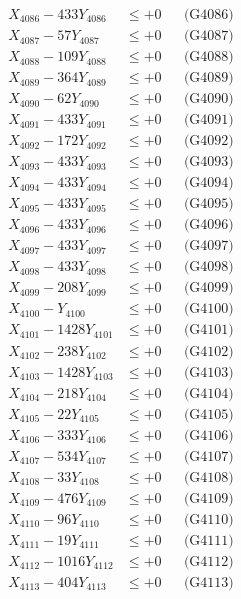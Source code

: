 \documentclass[a4paper,10pt]{article}
\begin{document}
{\begin{align}
X_{4086} - 433Y_{4086} &\leq +0 && \text{(G4086)} \\
X_{4087} - 57Y_{4087} &\leq +0 && \text{(G4087)} \\
X_{4088} - 109Y_{4088} &\leq +0 && \text{(G4088)} \\
X_{4089} - 364Y_{4089} &\leq +0 && \text{(G4089)} \\
X_{4090} - 62Y_{4090} &\leq +0 && \text{(G4090)} \\
\allowbreak
X_{4091} - 433Y_{4091} &\leq +0 && \text{(G4091)} \\
X_{4092} - 172Y_{4092} &\leq +0 && \text{(G4092)} \\
X_{4093} - 433Y_{4093} &\leq +0 && \text{(G4093)} \\
X_{4094} - 433Y_{4094} &\leq +0 && \text{(G4094)} \\
X_{4095} - 433Y_{4095} &\leq +0 && \text{(G4095)} \\
X_{4096} - 433Y_{4096} &\leq +0 && \text{(G4096)} \\
X_{4097} - 433Y_{4097} &\leq +0 && \text{(G4097)} \\
X_{4098} - 433Y_{4098} &\leq +0 && \text{(G4098)} \\
X_{4099} - 208Y_{4099} &\leq +0 && \text{(G4099)} \\
X_{4100} - Y_{4100} &\leq +0 && \text{(G4100)} \\
\allowbreak
X_{4101} - 1428Y_{4101} &\leq +0 && \text{(G4101)} \\
X_{4102} - 238Y_{4102} &\leq +0 && \text{(G4102)} \\
X_{4103} - 1428Y_{4103} &\leq +0 && \text{(G4103)} \\
X_{4104} - 218Y_{4104} &\leq +0 && \text{(G4104)} \\
X_{4105} - 22Y_{4105} &\leq +0 && \text{(G4105)} \\
X_{4106} - 333Y_{4106} &\leq +0 && \text{(G4106)} \\
X_{4107} - 534Y_{4107} &\leq +0 && \text{(G4107)} \\
X_{4108} - 33Y_{4108} &\leq +0 && \text{(G4108)} \\
X_{4109} - 476Y_{4109} &\leq +0 && \text{(G4109)} \\
X_{4110} - 96Y_{4110} &\leq +0 && \text{(G4110)} \\
\allowbreak
X_{4111} - 19Y_{4111} &\leq +0 && \text{(G4111)} \\
X_{4112} - 1016Y_{4112} &\leq +0 && \text{(G4112)} \\
X_{4113} - 404Y_{4113} &\leq +0 && \text{(G4113)} \\

\end{align}}
\end{document}
